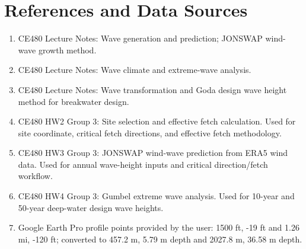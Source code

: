 \documentclass[11pt,a4paper]{article}
\begin{document}
\section{References and Data Sources}
\begin{enumerate}[leftmargin=1.0cm]
    \item CE480 Lecture Notes: Wave generation and prediction; JONSWAP wind-wave growth method.
    \item CE480 Lecture Notes: Wave climate and extreme-wave analysis.
    \item CE480 Lecture Notes: Wave transformation and Goda design wave height method for breakwater design.
    \item CE480 HW2 Group 3: Site selection and effective fetch calculation. Used for site coordinate, critical fetch directions, and effective fetch methodology.
    \item CE480 HW3 Group 3: JONSWAP wind-wave prediction from ERA5 wind data. Used for annual wave-height inputs and critical direction/fetch workflow.
    \item CE480 HW4 Group 3: Gumbel extreme wave analysis. Used for 10-year and 50-year deep-water design wave heights.
    \item Google Earth Pro profile points provided by the user: 1500 ft, -19 ft and 1.26 mi, -120 ft; converted to 457.2 m, 5.79 m depth and 2027.8 m, 36.58 m depth.
\end{enumerate}
\end{document}
